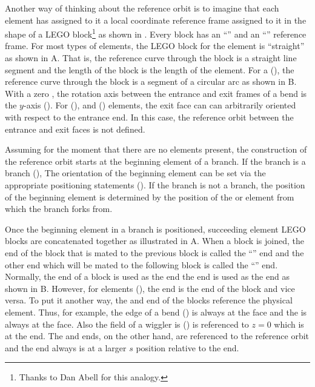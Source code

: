 
Another way of thinking about the reference orbit is to imagine that
each element has assigned to it a local coordinate reference frame
assigned to it in the shape of a LEGO block\footnote{Thanks to Dan
Abell for this analogy.} as shown in .  Every
block has an ``'' and an ``'' reference frame.
For most types of elements, the LEGO block for the element is
``straight'' as shown in A. That is, the
reference curve through the block is a straight line segment and the
length of the block is the length of the element. For a 
(), the reference curve through the block is a segment of
a circular arc as shown in B. With a zero
, the rotation axis between the entrance and exit frames of a
bend is the $y$-axis (). For 
(), and  () elements,
the exit face can can arbitrarily oriented with respect to the
entrance end. In this case, the reference orbit between the entrance
and exit faces is not defined.

Assuming for the moment that there are no  elements
present, the construction of the reference orbit starts at the
beginning element of a branch. If the branch is a  branch
(), The orientation of the beginning element can
be set via the appropriate positioning statements
(). If the branch is not a  branch, the
position of the beginning element is determined by the position of the
 or  element from which the branch forks
from.

Once the beginning element in a branch is positioned, succeeding
element LEGO blocks are concatenated together as illustrated in
A. When a block is joined, the end of the block that is
mated to the previous block is called the ``'' end and
the other end which will be mated to the following block is called the
``'' end.  Normally, the  end of a block
is used as the  end the  end is used as the
 end as shown in B. However, for
 elements (), the  end
is the  end of the block and vice versa. To put it another
way, the  and  end of the blocks reference the
physical element. Thus, for example, the  edge of a bend
() is always at the  face and the  is
always at the face. Also the field of a wiggler is
() is referenced to $z = 0$ which is at the
 end. The  and  ends, on the
other hand, are referenced to the reference orbit and the
 end always is at a larger $s$ position relative to the
 end.

